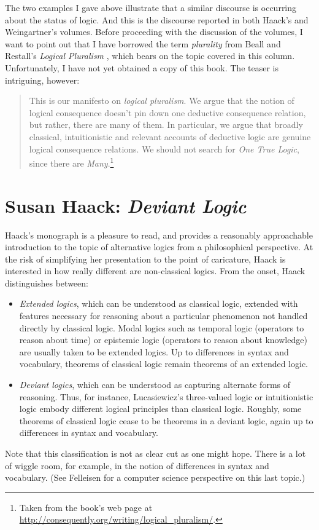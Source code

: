 \documentclass[11pt]{article}
\newcommand{\<}{\langle}
\renewcommand{\>}{\rangle}
\begin{document}
The two examples I gave above illustrate that a similar discourse is
occurring about the status of logic. 
And this is the discourse reported in both Haack's and Weingartner's
volumes. 
Before proceeding with the discussion of the volumes, I want to point
out that I have borrowed the term \emph{plurality} from Beall and
Restall's \emph{Logical Pluralism} \cite{r:beall06}, which bears on the
topic covered in this column. Unfortunately, I have not yet obtained a
copy of this book. 
The teaser is intriguing, however:
\begin{quote}
This is our manifesto on \emph{logical pluralism}. We argue that the
notion of logical consequence doesn't pin down one deductive
consequence relation, but rather, there are many of them. In
particular, we argue that broadly classical, intuitionistic and
relevant accounts of deductive logic are genuine logical consequence
relations. We should not search for \emph{One True Logic}, since there
are \emph{Many}.\footnote{Taken from the book's web page at
  \url{http://consequently.org/writing/logical_pluralism/}.}
\end{quote}



\section*{Susan Haack: \emph{Deviant Logic}}


Haack's monograph is a pleasure to read, and provides a reasonably
approachable introduction to the topic of alternative logics from a
philosophical perspective.
At the risk of simplifying her presentation to the point
of caricature, Haack is interested in how
really different are non-classical logics.
From the onset, Haack distinguishes between:
\begin{itemize}
\item \emph{Extended logics}, which can be understood as classical
logic, extended with features necessary for reasoning about a
particular phenomenon not handled directly by classical logic. 
Modal logics such as temporal logic (operators to reason about time)
or epistemic logic (operators to reason about knowledge) are usually
taken to be extended logics.
Up to differences in syntax and vocabulary, theorems of classical
logic remain theorems of an extended logic.

\item \emph{Deviant logics}, which can be understood as capturing alternate
forms of reasoning.
Thus, for instance, Lucasiewicz's three-valued logic or intuitionistic
logic embody different logical principles than classical logic.
Roughly, some theorems of classical logic cease to be theorems in a
deviant logic, again up to differences in syntax and vocabulary.

\end{itemize}
Note that this classification is not as clear cut as one might hope.
There is a lot of wiggle room, for example, in the notion of
differences in syntax and vocabulary. (See Felleisen
\cite{r:felleisen91} for a computer science perspective on this last
topic.)
\end{document}
